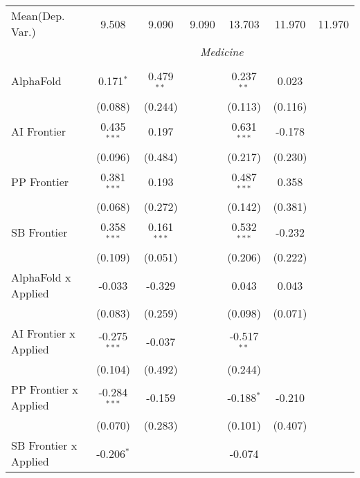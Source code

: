 \begin{tabular}{lcccccc}
Mean(Dep. Var.) & 9.508 & 9.090 & 9.090 & 13.703 & 11.970 & 11.970 \\
 & \multicolumn{6}{c}{\textit{Medicine}} \\ \\
   AlphaFold                      & 0.171$^{*}$    & 0.479$^{**}$  &                & 0.237$^{**}$  & 0.023   &   \\   
                                  & (0.088)        & (0.244)       &                & (0.113)       & (0.116) &   \\   
   AI Frontier                    & 0.435$^{***}$  & 0.197         &                & 0.631$^{***}$ & -0.178  &   \\   
                                  & (0.096)        & (0.484)       &                & (0.217)       & (0.230) &   \\   
   PP Frontier                    & 0.381$^{***}$  & 0.193         &                & 0.487$^{***}$ & 0.358   &   \\   
                                  & (0.068)        & (0.272)       &                & (0.142)       & (0.381) &   \\   
   SB Frontier                    & 0.358$^{***}$  & 0.161$^{***}$ &                & 0.532$^{***}$ & -0.232  &   \\   
                                  & (0.109)        & (0.051)       &                & (0.206)       & (0.222) &   \\   
   AlphaFold x Applied            & -0.033         & -0.329        &                & 0.043         & 0.043   &   \\   
                                  & (0.083)        & (0.259)       &                & (0.098)       & (0.071) &   \\   
   AI Frontier x Applied          & -0.275$^{***}$ & -0.037        &                & -0.517$^{**}$ &         &   \\   
                                  & (0.104)        & (0.492)       &                & (0.244)       &         &   \\   
   PP Frontier x Applied          & -0.284$^{***}$ & -0.159        &                & -0.188$^{*}$  & -0.210  &   \\   
                                  & (0.070)        & (0.283)       &                & (0.101)       & (0.407) &   \\   
   SB Frontier x Applied          & -0.206$^{*}$   &               &                & -0.074        &         &   \\   

\end{tabular}
